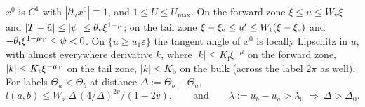 \begin{lemma}\label{lem:HTp-len}
$x^0$ is $C^1$ with $|\partial_ux^0|\equiv1$, and $1\le U\le U_{\max}$. On the forward zone $\xi\le u\le W_{\mathrm v}\xi$ and
$|T-\hat u|\le|\psi|\le\theta_{\mathrm v}\xi^{1-\mu}$; on the tail zone $\xi-\xi_{\mathrm e}\le u'\le W_{\mathrm t}(\xi-\xi_{\mathrm e})$ and
$-\theta_{\mathrm t}\xi^{1-\mu_{\mathrm T}}\le\psi<0$. On $\{u\ge u_1\varepsilon\}$ the tangent angle of $x^0$ is locally Lipschitz in $u$, with almost
everywhere derivative $k$, where $|k|\le K_{\mathrm f}\xi^{-\mu}$ on the forward zone, $|k|\le K_{\mathrm t}\xi^{-\mu_{\mathrm T}}$ on the tail zone,
$|k|\le K_{\mathrm b}$ on the bulk (across the label $2\pi$ as well). For labels $\Theta_a<\Theta_b$ at distance $\Delta:=\Theta_b-\Theta_a$,
\begin{equation}\label{eq:HTp-len}
l(a,b)\le W_x\,\Delta\,(4/\Delta)^{2v}/(1-2v),\qquad\text{and}\qquad\lambda:=u_b-u_a>\lambda_0\ \Longrightarrow\ \Delta>\Delta_0 .
\end{equation}
\end{lemma}
